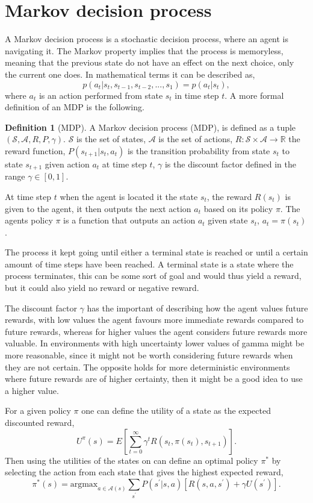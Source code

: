 \documentclass[12pt,A4]{report}
\theoremstyle{definition}
\newtheorem{definition}{Definition}[section]
\begin{document}
\section{Markov decision process}
A Markov decision process is a stochastic decision process, where an agent is navigating it. The Markov property implies that the process is memoryless, meaning that the previous state do not have an effect on the next choice, only the current one does. In mathematical terms it can be described as,
\[ p(a_t|s_t, s_{t-1}, s_{t-2}, ... , s_1) = p(a_t|s_t),\]
where $a_t$ is an action performed from state $s_t$ in time step $t$. A more formal definition of an MDP is the following. 
\begin{definition}[MDP]
    A Markov decision process (MDP), is defined as a tuple $(\mathcal{S}, \mathcal{A}, R, P, \gamma)$. $\mathcal{S}$ is the set of states, $\mathcal{A}$ is the set of actions, $R: \mathcal{S} \times \mathcal{A} \rightarrow \mathbb{R}$ the reward function, $P(s_{t+1}|s_t, a_t)$ is the transition probability from state $s_t$ to state $s_{t+1}$ given action $a_t$ at time step $t$, $\gamma$ is the discount factor defined in the range $\gamma \in [0, 1]$.
\end{definition}

At time step $t$ when the agent is located it the state $s_t$, the reward $R(s_t)$ is given to the agent, it then outputs the next action $a_t$ based on its policy $\pi$. The agents policy $\pi$ is a function that outputs an action $a_t$ given state $s_t$, $a_t = \pi(s_t)$. 

The process it kept going until either a terminal state is reached or until a certain amount of time steps have been reached. A terminal state is a state where the process terminates, this can be some sort of goal and would thus yield a reward, but it could also yield no reward or negative reward.

The discount factor $\gamma$ has the important of describing how the agent values future rewards, with low values the agent favours more immediate rewards compared to future rewards, whereas for higher values the agent considers future rewards more valuable. In environments with high uncertainty lower values of gamma might be more reasonable, since it might not be worth considering future rewards when they are not certain. The opposite holds for more deterministic environments where future rewards are of higher certainty, then it might be a good idea to use a higher value.

For a given policy $\pi$ one can define the utility of a state as the expected discounted reward,
\[ U^\pi (s) = E \left [ \sum_{t=0}^\infty \gamma^t R(s_t, \pi(s_t), s_{t+1}) \right ]. \]
Then using the utilities of the states on can define an optimal policy $\pi^*$ by selecting the action from each state that gives the highest expected reward,
\[ \pi^*(s) = \text{argmax}_{a \in \mathcal{A}(s)} \sum_{s^{\prime}} P(s^{\prime}|s,a)[R(s, a, s^\prime) + \gamma U(s^\prime)]. \]
\end{document}
